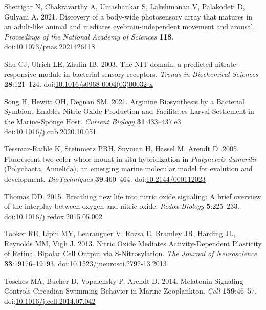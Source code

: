 \documentclass[
  10pt,
  onecolumn]{article}
\newlength{\cslhangindent}
\newlength{\cslentryspacingunit} %
\newenvironment{CSLReferences}[2] %
 {%
  \setlength{\parindent}{0pt}
  \ifodd #1
  \let\oldpar\par
  \def\par{\hangindent=\cslhangindent\oldpar}
  \fi
  \setlength{\parskip}{#2\cslentryspacingunit}
 }%
 {}
\begin{document}
\begin{CSLReferences}{1}{0}
\leavevmode{}%
Shettigar N, Chakravarthy A, Umashankar S, Lakshmanan V, Palakodeti D,
Gulyani A. 2021. Discovery of a body-wide photosensory array that
matures in an adult-like animal and mediates
eye{\textendash}brain-independent movement and arousal.
\emph{Proceedings of the National Academy of Sciences} \textbf{118}.
doi:\href{https://doi.org/10.1073/pnas.2021426118}{10.1073/pnas.2021426118}

\leavevmode{}%
Shu CJ, Ulrich LE, Zhulin IB. 2003. The NIT domain: a predicted
nitrate-responsive module in bacterial sensory receptors. \emph{Trends
in Biochemical Sciences} \textbf{28}:121--124.
doi:\href{https://doi.org/10.1016/s0968-0004(03)00032-x}{10.1016/s0968-0004(03)00032-x}

\leavevmode{}%
Song H, Hewitt OH, Degnan SM. 2021. Arginine Biosynthesis by a Bacterial
Symbiont Enables Nitric Oxide Production and Facilitates Larval
Settlement in the Marine-Sponge Host. \emph{Current Biology}
\textbf{31}:433--437.e3.
doi:\href{https://doi.org/10.1016/j.cub.2020.10.051}{10.1016/j.cub.2020.10.051}

\leavevmode{}%
Tessmar-Raible K, Steinmetz PRH, Snyman H, Hassel M, Arendt D. 2005.
Fluorescent two-color whole mount in situ hybridization in
{\emph{Platynereis dumerilii}} (Polychaeta, Annelida), an emerging
marine molecular model for evolution and development.
\emph{BioTechniques} \textbf{39}:460--464.
doi:\href{https://doi.org/10.2144/000112023}{10.2144/000112023}

\leavevmode{}%
Thomas DD. 2015. Breathing new life into nitric oxide signaling: A brief
overview of the interplay between oxygen and nitric oxide. \emph{Redox
Biology} \textbf{5}:225--233.
doi:\href{https://doi.org/10.1016/j.redox.2015.05.002}{10.1016/j.redox.2015.05.002}

\leavevmode{}%
Tooker RE, Lipin MY, Leuranguer V, Rozsa E, Bramley JR, Harding JL,
Reynolds MM, Vigh J. 2013. Nitric Oxide Mediates Activity-Dependent
Plasticity of Retinal Bipolar Cell Output via S-Nitrosylation. \emph{The
Journal of Neuroscience} \textbf{33}:19176--19193.
doi:\href{https://doi.org/10.1523/jneurosci.2792-13.2013}{10.1523/jneurosci.2792-13.2013}

\leavevmode{}%
Tosches MA, Bucher D, Vopalensky P, Arendt D. 2014. Melatonin Signaling
Controls Circadian Swimming Behavior in Marine Zooplankton. \emph{Cell}
\textbf{159}:46--57.
doi:\href{https://doi.org/10.1016/j.cell.2014.07.042}{10.1016/j.cell.2014.07.042}


\end{CSLReferences}
\end{document}

